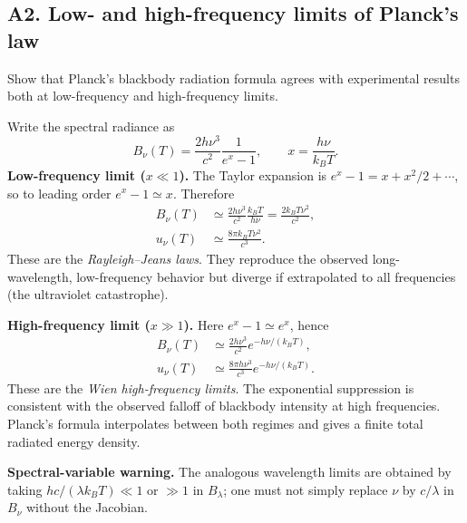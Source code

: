 \documentclass[11pt,a4paper]{article}
\begin{document}
\subsection{A2. Low- and high-frequency limits of Planck's law}
\begin{questionbox}Show that Planck's blackbody radiation formula agrees with experimental results both at low-frequency and high-frequency limits.\end{questionbox}
Write the spectral radiance as
\begin{equation}
B_\nu(T)=\frac{2h\nu^3}{c^2}\frac{1}{e^x-1},\qquad x=\frac{h\nu}{k_BT}.
\end{equation}
\textbf{Low-frequency limit ($x\ll1$).} The Taylor expansion is $e^x-1=x+x^2/2+\cdots$, so to leading order $e^x-1\simeq x$. Therefore
\begin{align}
B_\nu(T)&\simeq\frac{2h\nu^3}{c^2}\frac{k_BT}{h\nu}
=\boxed{\frac{2k_BT\nu^2}{c^2}},\\
u_\nu(T)&\simeq\boxed{\frac{8\pi k_BT\nu^2}{c^3}}.
\end{align}
These are the \emph{Rayleigh--Jeans laws}. They reproduce the observed long-wavelength, low-frequency behavior but diverge if extrapolated to all frequencies (the ultraviolet catastrophe).
\par\textbf{High-frequency limit ($x\gg1$).} Here $e^x-1\simeq e^x$, hence
\begin{align}
B_\nu(T)&\simeq\boxed{\frac{2h\nu^3}{c^2}e^{-h\nu/(k_BT)}},\\
u_\nu(T)&\simeq\boxed{\frac{8\pi h\nu^3}{c^3}e^{-h\nu/(k_BT)}}.
\end{align}
These are the \emph{Wien high-frequency limits}. The exponential suppression is consistent with the observed falloff of blackbody intensity at high frequencies. Planck's formula interpolates between both regimes and gives a finite total radiated energy density.
\par\textbf{Spectral-variable warning.} The analogous wavelength limits are obtained by taking $hc/(\lambda k_BT)\ll1$ or $\gg1$ in $B_\lambda$; one must not simply replace $\nu$ by $c/\lambda$ in $B_\nu$ without the Jacobian.
\end{document}

